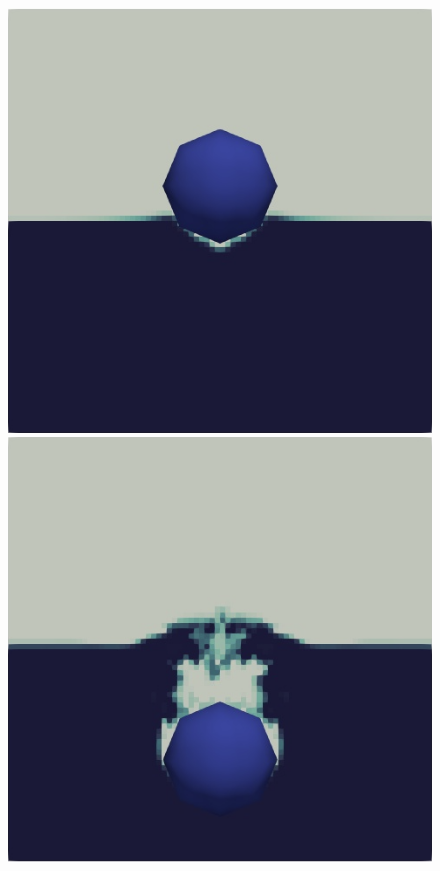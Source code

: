 \begin{figure}[H]
\begin{minipage}{.4\textwidth}
        \includegraphics[width=\linewidth]{GWU_Thesis_Sarmakeeva/Images/chap4/water_sphere/sphere_in_water02.png}
    \end{minipage}
    \newline
    \begin{minipage}{.4\textwidth}
        \centering
        \includegraphics[width=\linewidth]{GWU_Thesis_Sarmakeeva/Images/chap4/water_sphere/sphere_in_water04.png}

\end{minipage}
\end{figure}
